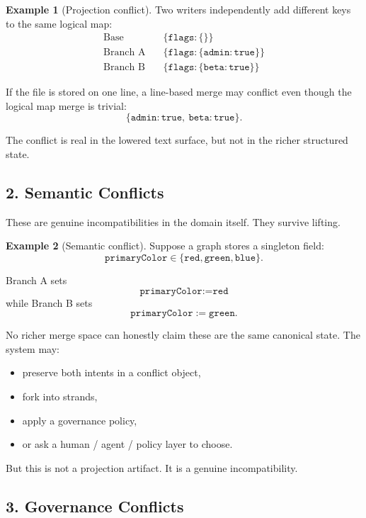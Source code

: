 \documentclass[11pt]{article}
\theoremstyle{definition}
\newtheorem{example}{Example}
\begin{document}
\begin{example}[Projection conflict]
Two writers independently add different keys to the same logical map:
\begin{align*}
\text{Base} \quad & \{\texttt{flags}: \{\}\} \\
\text{Branch A} \quad & \{\texttt{flags}: \{\texttt{admin}: \texttt{true}\}\} \\
\text{Branch B} \quad & \{\texttt{flags}: \{\texttt{beta}: \texttt{true}\}\}
\end{align*}

If the file is stored on one line, a line-based merge may conflict even though
the logical map merge is trivial:
\[
\{\texttt{admin}: \texttt{true},\ \texttt{beta}: \texttt{true}\}.
\]

The conflict is real in the lowered text surface, but not in the richer
structured state.
\end{example}

\subsection{2. Semantic Conflicts}

These are genuine incompatibilities in the domain itself. They survive lifting.

\begin{example}[Semantic conflict]
Suppose a graph stores a singleton field:
\[
\texttt{primaryColor} \in \{\texttt{red},\texttt{green},\texttt{blue}\}.
\]

Branch A sets
\[
\texttt{primaryColor} := \texttt{red}
\]
while Branch B sets
\[
\texttt{primaryColor} := \texttt{green}.
\]

No richer merge space can honestly claim these are the same canonical state.
The system may:
\begin{itemize}[leftmargin=2em]
\item preserve both intents in a conflict object,
\item fork into strands,
\item apply a governance policy,
\item or ask a human / agent / policy layer to choose.
\end{itemize}

But this is not a projection artifact. It is a genuine incompatibility.
\end{example}

\subsection{3. Governance Conflicts}
\end{document}

